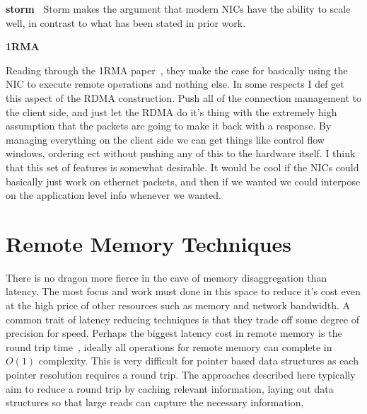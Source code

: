 \textbf{storm~\cite{storm}} Storm makes the argument that modern NICs have the
ability to scale well, in contrast to what has been stated in prior work.

\textbf{1RMA~\cite{1rma}}

Reading through the 1RMA paper~\cite{1rma}, they make the case for basically
using the NIC to execute remote operations and nothing else. In some respects I
def get this aspect of the RDMA construction. Push all of the connection
management to the client side, and just let the RDMA do it's thing with the
extremely high assumption that the packets are going to make it back with a
response. By managing everything on the client side we can get things like
control flow windows, ordering ect without pushing any of this to the hardware
itself. I think that this set of features is somewhat desirable. It would be
cool if the NICs could basically just work on ethernet packets, and then if we
wanted we could interpose on the application level info whenever we wanted.


\section{Remote Memory Techniques}
\label{sec:techniques}

There is no dragon more fierce in the cave of memory disaggregation than
latency. The most focus and work must done in this space to reduce it's cost
even at the high price of other resources such as memory and network bandwidth.
A common trait of latency reducing techniques is that they trade off some degree
of precision for speed. Perhaps the biggest latency cost in remote memory is the
round trip time~\cite{design-far-memory-struct}, ideally all operations for
remote memory can complete in $O(1)$ complexity. This is very difficult for
pointer based data structures as each pointer resolution requires a round trip.
The approaches described here typically aim to reduce a round trip by caching
relevant information, laying out data structures so that large reads can capture
the necessary information, 


